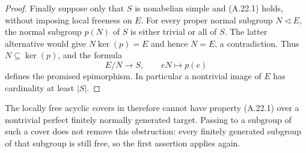 \begin{proof}
Finally suppose only that $S$ is nonabelian simple and (A.22.1)
holds, without imposing local freeness on $E$. For every proper
normal subgroup $N\triangleleft E$, the normal subgroup $p(N)$
of $S$ is either trivial or all of $S$. The latter alternative
would give $N\ker(p)=E$ and hence $N=E$, a contradiction.
Thus $N\subseteq\ker(p)$, and the formula
\[
 E/N\longrightarrow S,\qquad eN\longmapsto p(e)
\]
defines the promised epimorphism. In particular a nontrivial
image of $E$ has cardinality at least $|S|$.
\end{proof}

The locally free acyclic covers in
\cite[Section~2, Proposition~2.3]{A_Berrick2010} therefore cannot
have property (A.22.1) over a nontrivial perfect finitely normally
generated target. Passing to a subgroup of such a cover does not
remove this obstruction: every finitely generated subgroup of
that subgroup is still free, so the first assertion applies again.

